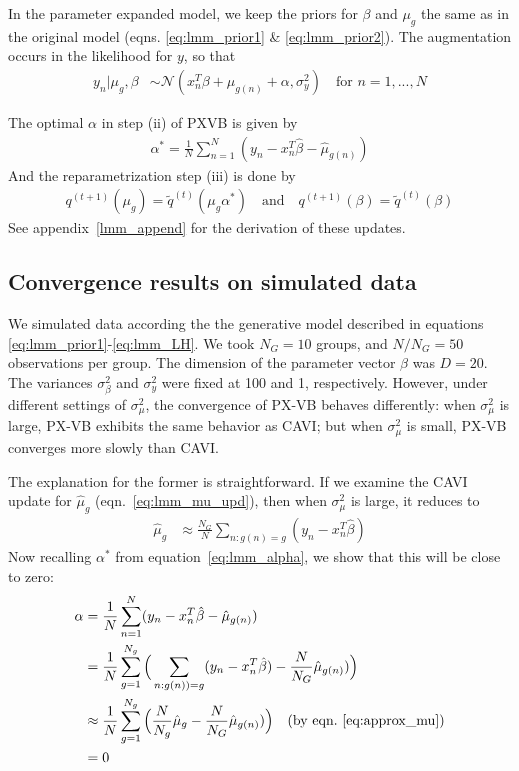 \documentclass{article}
\begin{document}
In the parameter expanded model, we keep the priors for $\beta$ and $\mu_g$ the same as in the original model (eqns. \ref{eq:lmm_prior1} \& \ref{eq:lmm_prior2}). The augmentation occurs in the likelihood for $y$, so that
\begin{align}
y_n | \mu_g, \beta &\sim \mathcal N (x_n^T\beta + \mu_{g(n)}+\alpha, \sigma^2_y)\quad \text{for $n = 1, ..., N$} 
\end{align}

The optimal $\alpha$ in step (ii) of PXVB is given by 
\begin{align}
\alpha^* =  \frac{1}{N}\sum_{n=1}^N (y_n - x_n^T\hat\beta - \hat\mu_{g(n)}) \label{eq:lmm_alpha}
\end{align}
And the reparametrization step (iii) is done by 
\begin{align}
    q^{(t+1)}(\mu_g) = \tilde q^{(t)}(\mu_g\alpha^*) \quad \text{and} \quad q^{(t+1)}(\beta) = \tilde q^{(t)}(\beta)
\end{align}
See appendix~\ref{lmm_append} for the derivation of these updates. 



\subsection{Convergence results on simulated data}
We simulated data according the the generative model described in equations \ref{eq:lmm_prior1}-\ref{eq:lmm_LH}. We took $N_G = 10$ groups, and $N/N_G = 50$ observations per group. The dimension of the parameter vector $\beta$ was $D = 20$. The variances $\sigma^2_\beta$ and $\sigma^2_y$ were fixed at 100 and 1, respectively. However, under different settings of $\sigma^2_\mu$, the convergence of PX-VB behaves differently: when $\sigma^2_\mu$ is large, PX-VB exhibits the same behavior as CAVI; but when $\sigma^2_\mu$ is small, PX-VB converges more slowly than CAVI. 

The explanation for the former is straightforward. If we examine the CAVI update for $\hat\mu_g$ (eqn.~\ref{eq:lmm_mu_upd}), then when $\sigma^2_\mu$ is large, it reduces to 
\begin{align}
{\hat\mu_g} &\approx \frac{N_G}{N}\sum_{n: g(n) = g} (y_n - x_n^T\hat\beta) \label{eq:approx_mu}
\end{align}
Now recalling $\alpha^*$ from equation~\ref{eq:lmm_alpha}, we show that this will be close to zero: 
\begin{align}
\alpha &= \frac{1}{N} \sum_{n=1}^N (y_n - x_n^T \hat\beta - \hat\mu_{g(n)})\\
    &= \frac{1}{N} \sum_{g=1}^{N_g} \Big(\sum_{n: g(n)) = g} (y_n - x_n^T \hat\beta)- \frac{N}{N_G}\hat\mu_{g(n)})\Big) \\
    &\approx \frac{1}{N} \sum_{g=1}^{N_g} \Big(\frac{N}{N_g}\hat\mu_g - \frac{N}{N_G}\hat\mu_{g(n)})\Big) \quad \text{(by eqn.~\ref{eq:approx_mu})}\\
    &= 0
\end{align}
\end{document}
